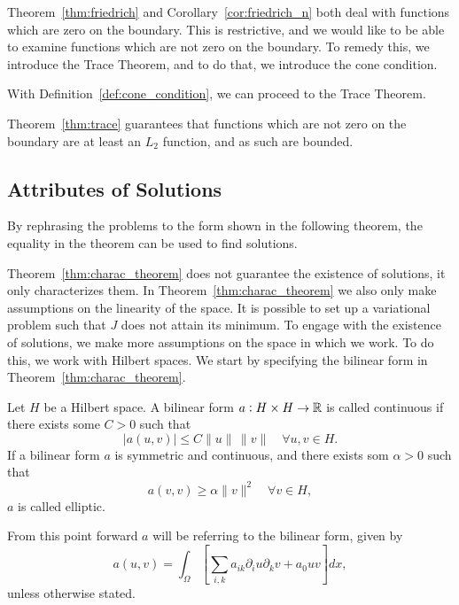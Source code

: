 
Theorem~\ref{thm:friedrich} and Corollary~\ref{cor:friedrich_n} both deal with 
functions which are zero on the boundary. 
This is restrictive, and we would like to be able to examine 
functions which are not zero on the boundary.
To remedy this, we introduce the Trace Theorem, and to 
do that, we introduce the cone condition.

With Definition~\ref{def:cone_condition}, we can proceed to the Trace Theorem.

Theorem~\ref{thm:trace} guarantees that functions which are not 
zero on the boundary are at least an $L_2$ function, and as such are bounded.
\subsection{Attributes of Solutions}
By rephrasing the problems to the form shown in the 
following theorem,
the equality in the theorem can be used to find solutions. %

Theorem~\ref{thm:charac_theorem} does not guarantee the existence 
of solutions, it only characterizes them. In Theorem~\ref{thm:charac_theorem} we 
also only make assumptions on the linearity of the space. 
It is possible to set up a variational problem such that $J$ does 
not attain its minimum.
To engage with the existence of solutions, we make more assumptions on 
the space in which we work. To do this, we work with Hilbert spaces. %
We start by specifying the bilinear form in Theorem~\ref{thm:charac_theorem}.
\begin{defn}{\quad}
   Let $H$ be a Hilbert space. A bilinear form $a : H \times H \to \mathbb{R}$ is 
   called continuous if there exists some $C > 0$ such that 
   \begin{equation}
    |a(u,v)| \leq C \|u\|\, \|v\| \quad \forall u,v \in H.
   \end{equation} 
   If a bilinear form $a$ is symmetric and continuous, and there exists som $\alpha >0$ such that 
   \begin{equation*}
    a(v,v) \geq \alpha \|v\|^2 \quad \forall v \in H,
   \end{equation*}
   $a$ is called elliptic.\label{def:elliptic}
 \end{defn}
From this point forward $a$ will be referring to the bilinear form, given by
\begin{equation}
   a(u,v) = \int_\Omega \left[\sum_{i,k} a_{ik}\partial_i u\partial_k v+a_0uv\right]dx,
\end{equation}
unless otherwise stated.


